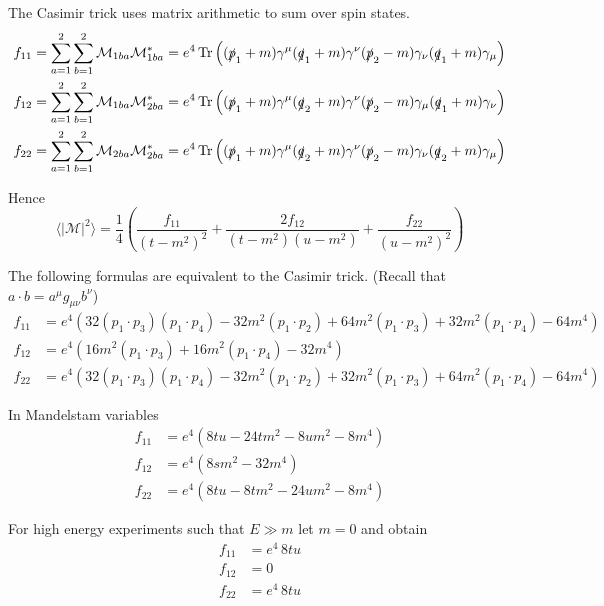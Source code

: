 The Casimir trick uses matrix arithmetic to sum over spin states.
\begin{align*}
f_{11}&=\sum_{a=1}^2\sum_{b=1}^2\mathcal M_{1ba}\mathcal M_{1ba}^*=e^4\operatorname{Tr}
\left(
(\slashed{p}_1+m)\gamma^\mu(\slashed q_1+m)\gamma^\nu(\slashed p_2-m)\gamma_\nu(\slashed q_1+m)\gamma_\mu
\right)
\\
f_{12}&=\sum_{a=1}^2\sum_{b=1}^2\mathcal M_{1ba}\mathcal M_{2ba}^*=e^4\operatorname{Tr}
\left(
(\slashed{p}_1+m)\gamma^\mu(\slashed q_2+m)\gamma^\nu(\slashed p_2-m)\gamma_\mu(\slashed q_1+m)\gamma_\nu
\right)
\\
f_{22}&=\sum_{a=1}^2\sum_{b=1}^2\mathcal M_{2ba}\mathcal M_{2ba}^*=e^4\operatorname{Tr}
\left(
(\slashed{p}_1+m)\gamma^\mu(\slashed q_2+m)\gamma^\nu(\slashed p_2-m)\gamma_\nu(\slashed q_2+m)\gamma_\mu
\right)
\end{align*}

Hence
\begin{equation*}
\langle|\mathcal{M}|^2\rangle
=
\frac{1}{4}
\left(
\frac{f_{11}}{(t-m^2)^2}
+\frac{2f_{12}}{(t-m^2)(u-m^2)}
+\frac{f_{22}}{(u-m^2)^2}
\right)
\end{equation*}

The following formulas are equivalent to the Casimir trick.
(Recall that $a\cdot b=a^\mu g_{\mu\nu}b^\nu$)
\begin{align*}
f_{11}&=e^4\left(
 32 (p_1 \cdot p_3) (p_1 \cdot p_4) -
 32 m^2 (p_1 \cdot p_2) +
 64 m^2 (p_1 \cdot p_3) +
 32 m^2 (p_1 \cdot p_4) - 64 m^4\right)
\\
f_{12}&=e^4\left(
 16 m^2 (p_1 \cdot p_3) +
 16 m^2 (p_1 \cdot p_4) - 32 m^4\right)
\\
f_{22}&=e^4\left(
 32 (p_1 \cdot p_3) (p_1 \cdot p_4) -
 32 m^2 (p_1 \cdot p_2) +
 32 m^2 (p_1 \cdot p_3) +
 64 m^2 (p_1 \cdot p_4) - 64 m^4\right)
\end{align*}

In Mandelstam variables
\begin{align*}
f_{11}&=e^4\left(8 t u - 24 t m^2 - 8 u m^2 - 8 m^4\right)
\\
f_{12}&=e^4\left(8 s m^2 - 32 m^4\right)
\\
f_{22}&=e^4\left(8 t u - 8 t m^2 - 24 u m^2 - 8 m^4\right)
\end{align*}

For high energy experiments such that $E\gg m$ let $m=0$ and obtain
\begin{align*}
f_{11}&=e^4\,8tu
\\
f_{12}&=0
\\
f_{22}&=e^4\,8tu
\end{align*}

